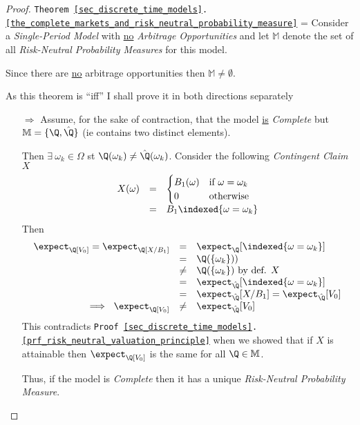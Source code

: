 \documentclass[11pt,a4paper]{article}
\begin{document}
  \begin{proof}{\texttt{Theorem \ref{sec_discrete_time_models}.\ref{the_complete_markets_and_risk_neutral_probability_measure}}}
    \everymath={\displaystyle}
    Consider a \textit{Single-Period Model} with \underline{no} \textit{Arbitrage Opportunities} and let $\mathbb{M}$ denote the set of all \textit{Risk-Neutral Probability Measures} for this model.
    \par Since there are \underline{no} arbitrage opportunities then $\mathbb{M}\neq\emptyset$.
    \par As this theorem is ``iff'' I shall prove it in both directions separately
    \begin{itemize}
      \item[$\Longrightarrow$] Assume, for the sake of contraction, that the model \underline{is} \textit{Complete} but $\mathbb{M}=\{\Q,\hat\Q\}$  (ie contains two distinct elements).
      \par Then $\exists\ \omega_k\in\Omega$ st $\Q(\omega_k)\neq\hat\Q(\omega_k)$. Consider the following \textit{Contingent Claim} $X$
      \[\begin{array}{rcl}
      X(\omega)&=&\begin{cases} B_1(\omega)&\text{if }\omega=\omega_k\\0&\text{otherwise}\end{cases}\\
      &=&B_1\indexed\{\omega=\omega_k\}
      \end{array}\]
      Then
      \[\begin{array}{rcl}
        \expect_\Q[V_0]=\expect_\Q[X/B_1]&=&\expect_\Q[\indexed\{\omega=\omega_k\}]\\
        &=&\Q(\{\omega_k\}))\\
        &\neq&\Q(\{\omega_k\})\text{ by def. }X\\
        &=&\expect_{\hat\Q}[\indexed\{\omega=\omega_k\}]\\
        &=&\expect_{\hat\Q}[X/B_1]=\expect_{\hat\Q}[V_0]\\
        \implies\ \expect_\Q[V_0]&\neq&\expect_{\hat\Q}[V_0]
      \end{array}\]
      This contradicts \texttt{Proof \ref{sec_discrete_time_models}.\ref{prf_risk_neutral_valuation_principle}}  when we showed that if $X$ is attainable then $\expect_\Q[V_0]$ is the same for all $\Q\in\mathbb{M}$.
      \par Thus, if the model is \textit{Complete} then it has a unique \textit{Risk-Neutral Probability Measure}.

\end{itemize}
\end{proof}
\end{document}
